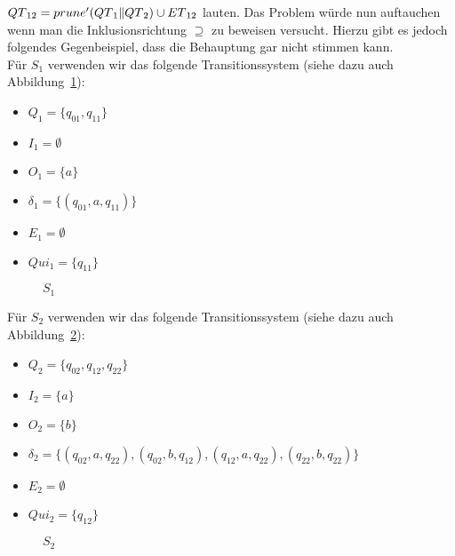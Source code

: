 $QT{}_{12}=prune' (QT{}_1\|QT{}_2)\cup ET{}_{12}$ lauten. Das Problem
würde nun auftauchen wenn man die Inklusionsrichtung $\supseteq$ zu beweisen
versucht. Hierzu gibt es jedoch folgendes Gegenbeispiel, dass die Behauptung
gar nicht stimmen kann.\\
Für $S_1$ verwenden wir das folgende Transitionssystem (siehe dazu auch
Abbildung~\ref{S1}):
\begin{itemize}
  \item $Q_1=\{q_{01}, q_{11}\}$
  \item $I_1=\emptyset$
  \item $O_1=\{a\}$
  \item $\delta _1 = \{(q_{01},a,q_{11})\}$
  \item $E_1=\emptyset$
  \item $Qui_1=\{q_{11}\}$
\end{itemize}
\begin{figure} [h!tbp]
\begin{center}
  \caption{$S_1$}
  \label{S1}
\end{center}
\end{figure}
Für $S_2$ verwenden wir das folgende Transitionssystem (siehe dazu auch
Abbildung~\ref{S2}):
\begin{itemize}
  \item $Q_2=\{q_{02}, q_{12}, q_{22}\}$
  \item $I_2=\{a\}$
  \item $O_2=\{b\}$
  \item $\delta _2 = \{(q_{02},a,q_{22}), (q_{02},b,q_{12}), (q_{12},a,q_{22}),
    (q_{22},b,q_{22})\}$
  \item $E_2=\emptyset$
  \item $Qui_2=\{q_{12}\}$
\end{itemize}
\begin{figure} [h!tbp]
\begin{center}
  \caption{$S_2$}
  \label{S2}
\end{center}
\end{figure}
